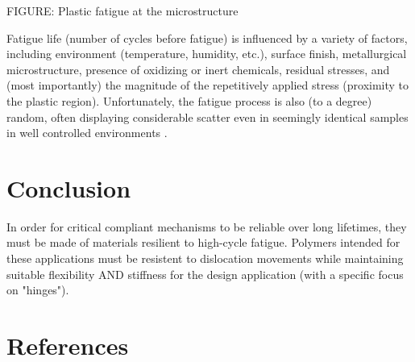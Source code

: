 \documentclass{report}
\begin{document}
FIGURE: Plastic fatigue at the microstructure

Fatigue life (number of cycles before fatigue) is influenced by a variety of factors, including environment (temperature, humidity, etc.), surface finish, metallurgical microstructure, presence of oxidizing or inert chemicals, residual stresses, and (most importantly) the magnitude of the repetitively applied stress (proximity to the plastic region). 
Unfortunately, the fatigue process is also (to a degree) random, often displaying considerable scatter even in seemingly identical samples in well controlled environments \cite{fatigue}.

\section{Conclusion}

In order for critical compliant mechanisms to be reliable over long lifetimes, they must be made of materials resilient to high-cycle fatigue. Polymers intended for these applications must be resistent to dislocation movements while maintaining suitable flexibility AND stiffness for the design application (with a specific focus on "hinges").

\pagebreak
\section{References}




\end{document}
